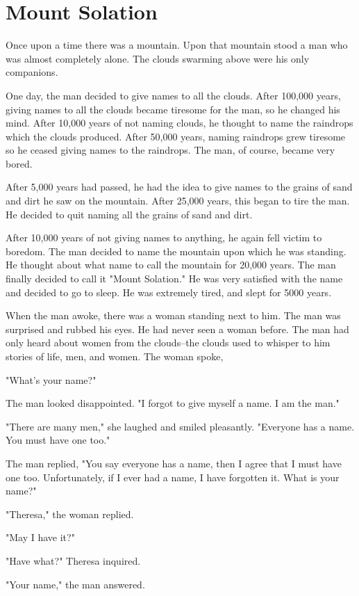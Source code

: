 \chapter{Mount Solation}

Once upon a time there was a mountain. Upon that mountain stood a man who was almost completely alone. The clouds swarming above were his only companions.

One day, the man decided to give names to all the clouds. After 100,000 years, giving names to all the clouds became tiresome for the man, so he changed his mind. After 10,000 years of not naming clouds, he thought to name the raindrops which the clouds produced. After 50,000 years, naming raindrops grew tiresome so he ceased giving names to the raindrops. The man, of course, became very bored.

After 5,000 years had passed, he had the idea to give names to the grains of sand and dirt he saw on the mountain. After 25,000 years, this began to tire the man. He decided to quit naming all the grains of sand and dirt.

After 10,000 years of not giving names to anything, he again fell victim to boredom. The man decided to name the mountain upon which he was standing. He thought about what name to call the mountain for 20,000 years. The man finally decided to call it "Mount Solation." He was very satisfied with the name and decided to go to sleep. He was extremely tired, and slept for 5000 years.

When the man awoke, there was a woman standing next to him. The man was surprised and rubbed his eyes. He had never seen a woman before. The man had only heard about women from the clouds--the clouds used to whisper to him stories of life, men, and women. The woman spoke,

"What's your name?"

The man looked disappointed. "I forgot to give myself a name. I am the man."

"There are many men," she laughed and smiled pleasantly. "Everyone has a name. You must have one too."

The man replied, "You say everyone has a name, then I agree that I must have one too. Unfortunately, if I ever had a name, I have forgotten it. What is your name?"

"Theresa," the woman replied.

"May I have it?"

"Have what?" Theresa inquired.

"Your name," the man answered.

